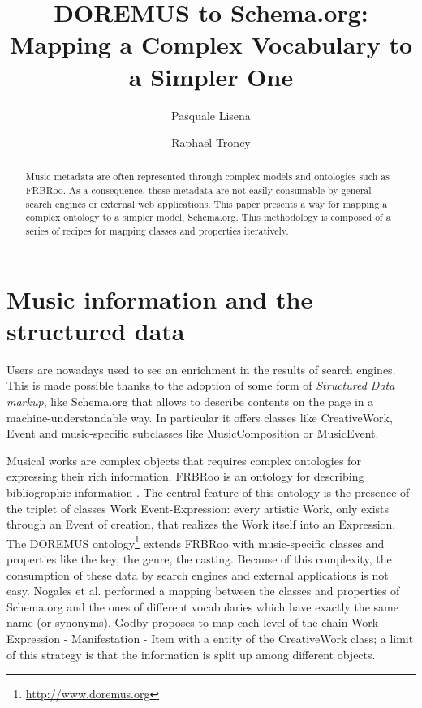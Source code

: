 \documentclass{llncs}
\begin{document}
\title{DOREMUS to Schema.org: Mapping a Complex Vocabulary to a Simpler One}

\author{Pasquale Lisena \and Rapha\"el Troncy}

\maketitle


\begin{abstract}
Music metadata are often represented through complex models and ontologies such as FRBRoo. As a consequence, these metadata are not easily consumable by general search engines or external web applications. This paper presents a way for mapping a complex ontology to a simpler model, Schema.org. This methodology is composed of a series of recipes for mapping classes and properties iteratively.

\end{abstract}


\section{Music information and the structured data}
\label{sec:introduction}

Users are nowadays used to see an enrichment in the results of search engines. This is made possible thanks to the adoption of some form of \textit{Structured Data markup}, like Schema.org \cite{guha2015schema} that allows to describe contents on the page in a machine-understandable way. In particular it offers classes like CreativeWork, Event and music-specific subclasses like MusicComposition or MusicEvent.

Musical works are complex objects that requires complex ontologies for expressing their rich information. FRBRoo is an ontology for describing bibliographic information \cite{doerr2008frbroo}. The central feature of this ontology is the presence of the triplet of classes Work Event-Expression: every artistic Work, only exists through an Event of creation, that realizes the Work itself into an Expression. The DOREMUS ontology\footnote{\url{http://www.doremus.org}} \cite{achichidoremus} extends FRBRoo with music-specific classes and properties like the key, the genre, the casting. Because of this complexity, the consumption of these data by search engines and external applications is not easy.
Nogales et al. \cite{nogales2016linking} performed a mapping between the classes and properties of Schema.org and the ones of different vocabularies which have exactly the same name (or synonyms).
Godby \cite{godby2013relationship} proposes to map each level of the chain Work - Expression - Manifestation - Item with a entity of the CreativeWork class; a limit of this strategy is that the information is split up among different objects.
\end{document}
